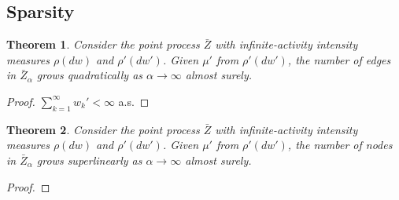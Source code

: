 \documentclass{article}
\newtheorem{theorem}{Theorem}[section]
\begin{document}
\subsection{Sparsity}

\begin{theorem} Consider the point process $\bar{Z}$ with infinite-activity intensity measures $\rho(dw)$ and $\rho'(dw')$. Given $\mu'$ from $\rho'(dw')$, the number of edges in $\bar{Z}_{\alpha}$ grows quadratically as $\alpha \rightarrow \infty$ almost surely.
\end{theorem}
\begin{proof}
$\sum_{k=1}^{\infty} w_k' < \infty$ a.s.
\end{proof}

\begin{theorem} Consider the point process $\bar{Z}$ with infinite-activity intensity measures $\rho(dw)$ and $\rho'(dw')$. Given $\mu'$ from $\rho'(dw')$, the number of nodes in $\bar{Z}_{\alpha}$ grows superlinearly as $\alpha \rightarrow \infty$ almost surely.
\end{theorem}
\begin{proof}
\end{proof}



\end{document}
